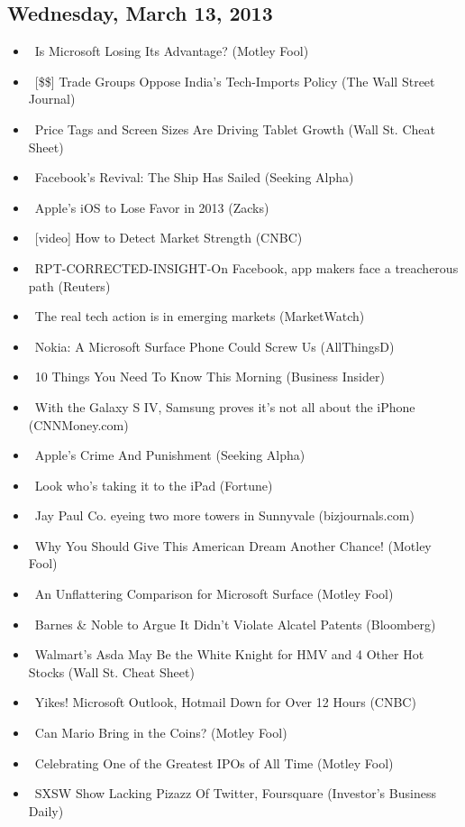 \documentclass[11pt,asymmetric]{article}
\begin{document}
\subsection*{Wednesday, March 13, 2013}
\begin{itemize}
\item\ Is Microsoft Losing Its Advantage? (Motley Fool)
\item\ [\$\$] Trade Groups Oppose India's Tech-Imports Policy (The Wall Street Journal)
\item\ Price Tags and Screen Sizes Are Driving Tablet Growth (Wall St. Cheat Sheet)
\item\ Facebook's Revival: The Ship Has Sailed (Seeking Alpha)
\item\ Apple's iOS to Lose Favor in 2013 (Zacks)
\item\ [video] How to Detect Market Strength (CNBC)
\item\ RPT-CORRECTED-INSIGHT-On Facebook, app makers face a treacherous path (Reuters)
\item\ The real tech action is in emerging markets (MarketWatch)
\item\ Nokia: A Microsoft Surface Phone Could Screw Us (AllThingsD)
\item\ 10 Things You Need To Know This Morning (Business Insider)
\item\ With the Galaxy S IV, Samsung proves it's not all about the iPhone (CNNMoney.com)
\item\ Apple's Crime And Punishment (Seeking Alpha)
\item\ Look who's taking it to the iPad (Fortune)
\item\ Jay Paul Co. eyeing two more towers in Sunnyvale (bizjournals.com)
\item\ Why You Should Give This American Dream Another Chance! (Motley Fool)
\item\ An Unflattering Comparison for Microsoft Surface (Motley Fool)
\item\ Barnes \& Noble to Argue It Didn't Violate Alcatel Patents (Bloomberg)
\item\ Walmart’s Asda May Be the White Knight for HMV and 4 Other Hot Stocks (Wall St. Cheat Sheet)
\item\ Yikes! Microsoft Outlook, Hotmail Down for Over 12 Hours (CNBC)
\item\ Can Mario Bring in the Coins? (Motley Fool)
\item\ Celebrating One of the Greatest IPOs of All Time (Motley Fool)
\item\ SXSW Show Lacking Pizazz Of Twitter, Foursquare (Investor's Business Daily)

\end{itemize}
\end{document}
